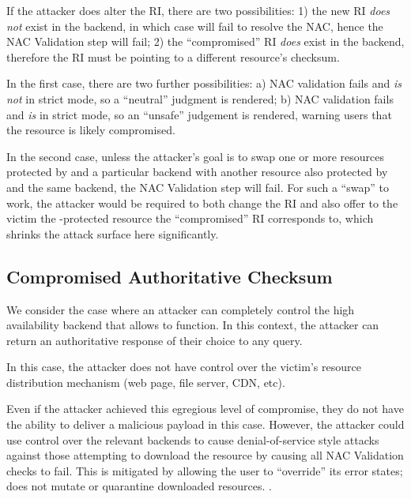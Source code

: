 If the attacker does alter the RI, there are two possibilities: 1) the new RI
\textit{does not} exist in the backend, in which case \SYSTEM{} will fail to
resolve the NAC, hence the NAC Validation step will fail; 2) the ``compromised''
RI \textit{does} exist in the backend, therefore the RI must be pointing to a
different resource's checksum.

In the first case, there are two further possibilities: a) NAC validation fails
and \SYSTEM{} \emph{is not} in strict mode, so a ``neutral'' judgment is
rendered; b) NAC validation fails and \SYSTEM{} \emph{is} in strict mode, so an
``unsafe'' judgement is rendered, warning users that the resource is likely
compromised. 

In the second case, unless the attacker's goal is to swap one or more resources
protected by \SYSTEM{} and a particular backend with another resource also
protected by \SYSTEM{} and the same backend, the NAC Validation step will fail.
For such a ``swap'' to work, the attacker would be required to both change the
RI and also offer to the victim the \SYSTEM{}-protected resource the
``compromised'' RI corresponds to, which shrinks the attack surface here
significantly. 

\subsection{Compromised Authoritative Checksum}

We consider the case where an attacker can completely control the high
availability backend that allows \SYSTEM{} to function. In this context, the
attacker can return an authoritative response of their choice to any query.

In this case, the attacker does not have control over the victim's resource
distribution mechanism (web page, file server, CDN, etc).

Even if the attacker achieved this egregious level of compromise, they do not
have the ability to deliver a malicious payload in this case. However, the
attacker could use control over the relevant backends to cause denial-of-service
style attacks against those attempting to download the resource by causing all
NAC Validation checks to fail. This is mitigated by \SYSTEM{} allowing the user
to ``override'' its error states; \ie \SYSTEM{} does not mutate or quarantine
downloaded resources. .

